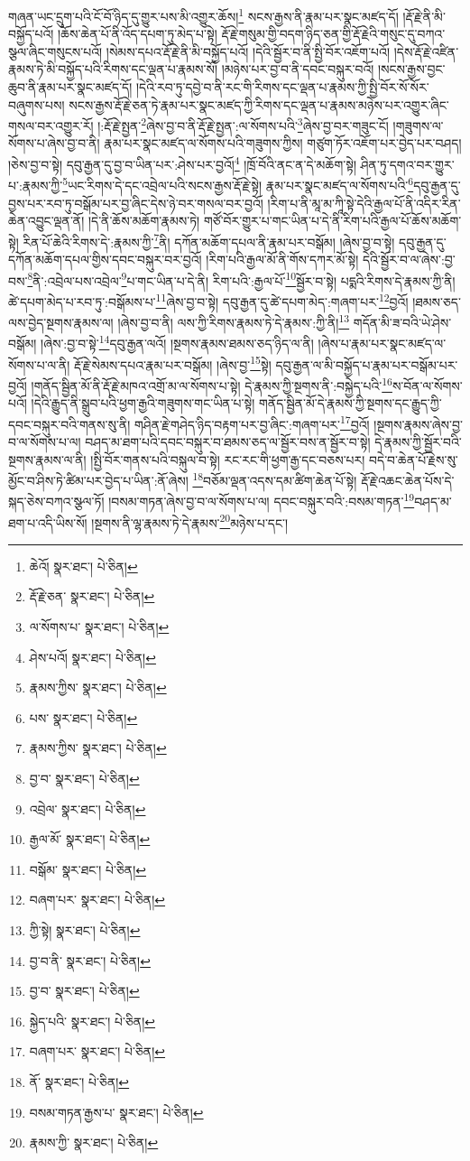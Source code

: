 གཞན་ཡང་དྲུག་པའི་ངོ་བོ་ཉིད་དུ་གྱུར་པས་མི་འགྱུར་ཆོས།\footnote{ཆེའོ།  སྣར་ཐང་།  པེ་ཅིན། } སངས་རྒྱས་ནི་རྣམ་པར་སྣང་མཛད་དོ། །རྡོ་རྗེ་ནི་མི་བསྐྱོད་པའོ། །ཆོས་ཆེན་པོ་ནི་འོད་དཔག་ཏུ་མེད་པ་སྟེ། རྡོ་རྗེ་གསུམ་གྱི་བདག་ཉིད་ཅན་གྱི་རྡོ་རྗེའི་གསུང་དུ་བཀའ་སྩལ་ཞིང་གསུངས་པའོ། །སེམས་དཔའ་རྡོ་རྗེ་ནི་མི་བསྐྱོད་པའོ། །དེའི་སྦྱོར་བ་ནི་སྤྱི་བོར་འཇོག་པའོ། །དེས་རྡོ་རྗེ་འཛིན་རྣམས་ཏེ་མི་བསྐྱོད་པའི་རིགས་དང་ལྡན་པ་རྣམས་སོ། །མཉེས་པར་བྱ་བ་ནི་དབང་བསྐུར་བའོ། །སངས་རྒྱས་བྱང་ཆུབ་ནི་རྣམ་པར་སྣང་མཛད་དོ། །དེའི་རབ་ཏུ་དབྱེ་བ་ནི་རང་གི་རིགས་དང་ལྡན་པ་རྣམས་ཀྱི་སྤྱི་བོར་སོ་སོར་བཞུགས་པས། སངས་རྒྱས་རྡོ་རྗེ་ཅན་ཏེ་རྣམ་པར་སྣང་མཛད་ཀྱི་རིགས་དང་ལྡན་པ་རྣམས་མཉེས་པར་འགྱུར་ཞིང་གསལ་བར་འགྱུར་རོ། །:རྡོ་རྗེ་སྤྱན་\footnote{རྡོ་རྗེ་ཅན་  སྣར་ཐང་།  པེ་ཅིན། }ཞེས་བྱ་བ་ནི་རྡོ་རྗེ་སྤྱན་:ལ་སོགས་པའི་\footnote{ལ་སོགས་པ་  སྣར་ཐང་།  པེ་ཅིན། }ཞེས་བྱ་བར་གཟུང་ངོ། །གཟུགས་ལ་སོགས་པ་ཞེས་བྱ་བ་ནི། རྣམ་པར་སྣང་མཛད་ལ་སོགས་པའི་གཟུགས་ཀྱིས། གཙུག་ཏོར་འཇོག་པར་བྱེད་པར་བཤད། །ཅེས་བྱ་བ་སྟེ། དབུ་རྒྱན་དུ་བྱ་བ་ཡིན་པར་:ཤེས་པར་བྱའོ།\footnote{ཤེས་པའོ།  སྣར་ཐང་།  པེ་ཅིན། } །ཁྲོ་བོའི་ནང་ན་དེ་མཆོག་སྟེ། ཤིན་ཏུ་དགའ་བར་གྱུར་པ་:རྣམས་ཀྱི་\footnote{རྣམས་ཀྱིས་  སྣར་ཐང་།  པེ་ཅིན། }ཡང་རིགས་དེ་དང་འབྲེལ་པའི་སངས་རྒྱས་རྡོ་རྗེ་སྟེ། རྣམ་པར་སྣང་མཛད་ལ་སོགས་པའི་\footnote{པས་  སྣར་ཐང་།  པེ་ཅིན། }དབུ་རྒྱན་དུ་བྱས་པར་རབ་ཏུ་བསྒོམ་པར་བྱ་ཞིང་དེས་ཉེ་བར་གསལ་བར་བྱའོ། །རིག་པ་ནི་མཱ་མ་ཀཱི་སྟེ་དེའི་རྒྱལ་པོ་ནི་འདིར་རིན་ཆེན་འབྱུང་ལྡན་ནོ། །དེ་ནི་ཆོས་མཆོག་རྣམས་ཏེ། གཙོ་བོར་གྱུར་པ་གང་ཡིན་པ་དེ་ནི་རིག་པའི་རྒྱལ་པོ་ཆོས་མཆོག་སྟེ། རིན་པོ་ཆེའི་རིགས་དེ་:རྣམས་ཀྱི་\footnote{རྣམས་ཀྱིས་  སྣར་ཐང་།  པེ་ཅིན། }ནི། དཀོན་མཆོག་དཔལ་ནི་རྣམ་པར་བསྒོམ། །ཞེས་བྱ་བ་སྟེ། དབུ་རྒྱན་དུ་དཀོན་མཆོག་དཔལ་གྱིས་དབང་བསྐུར་བར་བྱའོ། །རིག་པའི་རྒྱལ་མོ་ནི་གོས་དཀར་མོ་སྟེ། དེའི་སྦྱོར་བ་ལ་ཞེས་:བྱ་བས་\footnote{བྱ་བ་  སྣར་ཐང་།  པེ་ཅིན། }ནི་:འབྲེལ་པས་འབྲེལ་\footnote{འབྲེལ་  སྣར་ཐང་།  པེ་ཅིན། }པ་གང་ཡིན་པ་དེ་ནི། རིག་པའི་:རྒྱལ་པོ་\footnote{རྒྱལ་མོ་  སྣར་ཐང་།  པེ་ཅིན། }སྦྱོར་བ་སྟེ། པདྨའི་རིགས་དེ་རྣམས་ཀྱི་ནི། ཚེ་དཔག་མེད་པ་རབ་ཏུ་:བསྒོམས་པ་\footnote{བསྒོམ་  སྣར་ཐང་།  པེ་ཅིན། }ཞེས་བྱ་བ་སྟེ། དབུ་རྒྱན་དུ་ཚེ་དཔག་མེད་:གཞག་པར་\footnote{བཞག་པར་  སྣར་ཐང་།  པེ་ཅིན། }བྱའོ། །ཐམས་ཅད་ལས་བྱེད་སྔགས་རྣམས་ལ། །ཞེས་བྱ་བ་ནི། ལས་ཀྱི་རིགས་རྣམས་ཏེ་དེ་རྣམས་:ཀྱི་ནི།\footnote{ཀྱི་སྟེ།  སྣར་ཐང་།  པེ་ཅིན། } གདོན་མི་ཟ་བའི་ཡེ་ཤེས་བསྒོམ། །ཞེས་:བྱ་བ་སྟེ་\footnote{བྱ་བ་ནི་  སྣར་ཐང་།  པེ་ཅིན། }དབུ་རྒྱན་ལའོ། །སྔགས་རྣམས་ཐམས་ཅད་ཉིད་ལ་ནི། །ཞེས་པ་རྣམ་པར་སྣང་མཛད་ལ་སོགས་པ་ལ་ནི། རྡོ་རྗེ་སེམས་དཔའ་རྣམ་པར་བསྒོམ། །ཞེས་བྱ་\footnote{བྱ་བ་  སྣར་ཐང་།  པེ་ཅིན། }སྟེ། དབུ་རྒྱན་ལ་མི་བསྐྱོད་པ་རྣམ་པར་བསྒོམ་པར་བྱའོ། །གནོད་སྦྱིན་མོ་ནི་རྡོ་རྗེ་མཁའ་འགྲོ་མ་ལ་སོགས་པ་སྟེ། དེ་རྣམས་ཀྱི་སྔགས་ནི་:བསྐྱེད་པའི་\footnote{སྐྱེད་པའི་  སྣར་ཐང་།  པེ་ཅིན། }ས་བོན་ལ་སོགས་པའོ། །དེའི་རྒྱུད་ནི་སྒྲུབ་པའི་ཕྱག་རྒྱའི་གཟུགས་གང་ཡིན་པ་སྟེ། གནོད་སྦྱིན་མོ་དེ་རྣམས་ཀྱི་སྔགས་དང་རྒྱུད་ཀྱི་དབང་བསྐུར་བའི་གནས་སུ་ནི། གཤིན་རྗེ་གཤེད་ཉིད་བརྟག་པར་བྱ་ཞིང་:གཞག་པར་\footnote{བཞག་པར་  སྣར་ཐང་།  པེ་ཅིན། }བྱའོ། །སྔགས་རྣམས་ཞེས་བྱ་བ་ལ་སོགས་པ་ལ། བཤད་མ་ཐག་པའི་དབང་བསྐུར་བ་ཐམས་ཅད་ལ་སྦྱོར་བས་ན་སྦྱོར་བ་སྟེ། དེ་རྣམས་ཀྱི་སྦྱོར་བའི་སྔགས་རྣམས་ལ་ནི། །སྤྱི་བོར་གནས་པའི་བསྐུལ་བ་སྟེ། རང་རང་གི་ཕྱག་རྒྱ་དང་བཅས་པར། བདེ་བ་ཆེན་པོ་རྗེས་སུ་མྱོང་བ་ཤིས་ཏེ་ཚིམ་པར་བྱེད་པ་ཡིན་:ནོ་ཞེས། \footnote{ནོ་  སྣར་ཐང་།  པེ་ཅིན། }བཅོམ་ལྡན་འདས་དམ་ཚིག་ཆེན་པོ་སྟེ། རྡོ་རྗེ་འཆང་ཆེན་པོས་དེ་སྐད་ཅེས་བཀའ་སྩལ་ཏོ། །བསམ་གཏན་ཞེས་བྱ་བ་ལ་སོགས་པ་ལ། དབང་བསྐུར་བའི་:བསམ་གཏན་\footnote{བསམ་གཏན་རྒྱས་པ་  སྣར་ཐང་།  པེ་ཅིན། }བཤད་མ་ཐག་པ་འདི་ཡིས་སོ། །སྔགས་ནི་ལྷ་རྣམས་ཏེ་དེ་རྣམས་\footnote{རྣམས་ཀྱི་  སྣར་ཐང་།  པེ་ཅིན། }མཉེས་པ་དང་། 